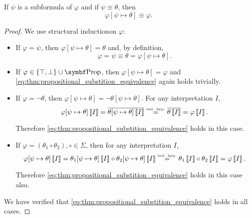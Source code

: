 \begin{proposition}\label{thm:propositional_substition_equivalence}
  If \( \psi \) is a subformula of \( \varphi \) and if \( \psi \equiv \theta \), then
  \begin{equation}\label{eq:thm:propositional_substition_equivalence}
    \varphi[\psi \mapsto \theta] \equiv \varphi.
  \end{equation}
\end{proposition}
\begin{proof}
  We use structural induction\IND on \( \varphi \):

  \begin{itemize}
    \item If \( \varphi = \psi \), then \( \varphi[\psi \mapsto \theta] = \theta \) and, by definition,
    \begin{equation*}
      \varphi = \psi \equiv \theta = \varphi[\psi \mapsto \theta].
    \end{equation*}

    \item If \( \varphi \in \{ \top, \bot \} \cup \Bold{Prop} \), then \( \varphi[\psi \mapsto \theta] = \varphi \) and \eqref{eq:thm:propositional_substition_equivalence} again holds trivially.

    \item If \( \varphi = \neg \theta \), then \( \varphi[\psi \mapsto \theta] = \neg \theta[\psi \mapsto \theta] \). For any interpretation \( I \),
    \begin{equation*}
      \varphi[\psi \mapsto \theta]\left\llbracket I \right\rrbracket
      =
      \overline{\theta[\psi \mapsto \theta]\left\llbracket I \right\rrbracket}
      \overset {\scriptscriptstyle{\text{ind. hyp.}}} =
      \overline{\theta\left\llbracket I \right\rrbracket}
      =
      \varphi\left\llbracket I \right\rrbracket.
    \end{equation*}

    Therefore \eqref{eq:thm:propositional_substition_equivalence} holds in this case.

    \item If \( \varphi = (\theta_1 \circ \theta_2), \circ \in \Sigma \), then for any interpretation \( I \),
    \begin{equation*}
      \varphi[\psi \mapsto \theta]\left\llbracket I \right\rrbracket
      =
      \theta_1[\psi \mapsto \theta]\left\llbracket I \right\rrbracket \circ \theta_2[\psi \mapsto \theta]\left\llbracket I \right\rrbracket
      \overset {\scriptscriptstyle{\text{ind. hyp.}}} =
      \theta_1\left\llbracket I \right\rrbracket \circ \theta_2\left\llbracket I \right\rrbracket
      =
      \varphi\left\llbracket I \right\rrbracket.
    \end{equation*}

    Therefore \eqref{eq:thm:propositional_substition_equivalence} holds in this case also.
  \end{itemize}

  We have verified that \eqref{eq:thm:propositional_substition_equivalence} holds in all cases.
\end{proof}

